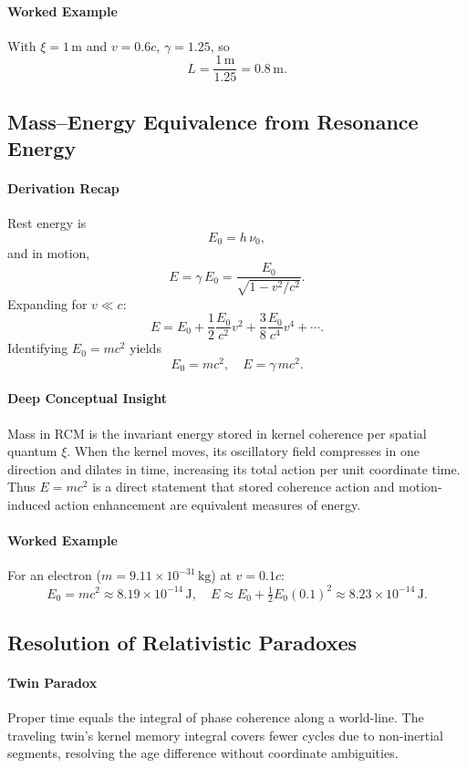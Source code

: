 \paragraph{Worked Example}  
With \(\xi=1\,\mathrm{m}\) and \(v=0.6c\), \(\gamma=1.25\), so
\[
  L = \frac{1\,\mathrm{m}}{1.25} = 0.8\,\mathrm{m}.
\]

\subsection{Mass–Energy Equivalence from Resonance Energy}

\paragraph{Derivation Recap}  
Rest energy is
\[
  E_0 = h\,\nu_0,
\]
and in motion,
\[
  E = \gamma\,E_0
    = \frac{E_0}{\sqrt{1 - v^2/c^2}}.
\]
Expanding for \(v\ll c\):
\[
  E = E_0 + \frac12\frac{E_0}{c^2}v^2 
        + \frac{3}{8}\frac{E_0}{c^4}v^4 + \cdots.
\]
Identifying \(E_0 = mc^2\) yields
\[
  E_0 = mc^2,
  \quad
  E = \gamma\,mc^2.
\]

\paragraph{Deep Conceptual Insight}  
Mass in RCM is the invariant energy stored in kernel coherence per spatial quantum \(\xi\). When the kernel moves, its oscillatory field compresses in one direction and dilates in time, increasing its total action per unit coordinate time. Thus \(E=mc^2\) is a direct statement that stored coherence action and motion-induced action enhancement are equivalent measures of energy.

\paragraph{Worked Example}  
For an electron (\(m=9.11\times10^{-31}\,\mathrm{kg}\)) at \(v=0.1c\):
\[
  E_0 = mc^2 \approx 8.19\times10^{-14}\,\mathrm{J},\quad
  E \approx E_0 + \tfrac12E_0(0.1)^2 \approx 8.23\times10^{-14}\,\mathrm{J}.
\]

\subsection{Resolution of Relativistic Paradoxes}

\paragraph{Twin Paradox}  
Proper time equals the integral of phase coherence along a world-line. The traveling twin’s kernel memory integral covers fewer cycles due to non-inertial segments, resolving the age difference without coordinate ambiguities.


